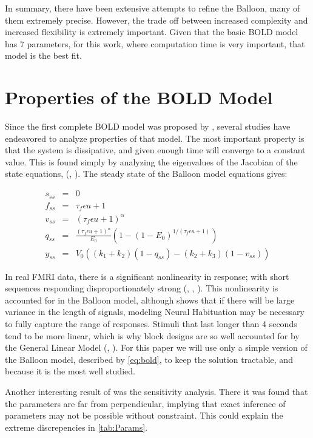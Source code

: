 In summary, there have been extensive attempts to refine the Balloon,
many of them extremely precise. However, the trade off 
between increased complexity and increased flexibility is extremely 
important. Given that the basic BOLD model has 7 parameters, for this
work, where computation time is very important, that model is
the best fit.


\section{Properties of the BOLD Model}
\label{sec:BOLD Analysis}
Since the first complete BOLD model was proposed by \cite{Friston2002}, 
several studies have endeavored to analyze properties of that model. 
The most important property is that the system is dissipative, and given
enough time will converge to a constant value. This is found simply by
analyzing the eigenvalues of the Jacobian of the state equations, 
(\cite{Deneux2006}, \cite{Hu2009}). The steady state of the Balloon
model equations gives:

\begin{eqnarray}
s_{ss} &=& 0 \nonumber \\
f_{ss} &=& \tau_f\epsilon u + 1\nonumber \\
v_{ss} &=& (\tau_f\epsilon u + 1)^\alpha\nonumber \\
q_{ss} &=& \frac{(\tau_f\epsilon u + 1)^\alpha}{E_0}(1-(1-E_0)^{1/(\tau_f\epsilon u + 1)})\nonumber \\
y_{ss} &=& V_0((k_1+k_2)(1-q_{ss}) - (k_2+k_3)(1-v_{ss}))
\label{eq:steadystate}
\end{eqnarray}

In real FMRI data, there is a significant nonlinearity in response; with short sequences
responding disproportionately strong (\cite{Birn2001}, \cite{Wager2005}, \cite{Deneux2006}).
This nonlinearity is accounted for in the Balloon model, although \cite{Deneux2006}
shows that if there will be large variance in the length of signals, 
modeling Neural Habituation may be necessary to fully capture the range of responses. 
Stimuli that last longer than 4 seconds 
tend to be more linear, which is why block designs are so well accounted for
by the General Linear Model (\cite{Birn2001}, \cite{Deneux2006}). For this 
paper we will use only a simple version of the Balloon model, described by
\autoref{eq:bold}, to keep the solution tractable, and because it is the most
well studied. 

Another interesting result of \cite{Deneux2006} was the sensitivity analysis.
There it was found that the parameters are far from perpendicular,
implying that exact inference of parameters may not be possible without
constraint. This could explain the extreme discrepencies in \autoref{tab:Params}.

